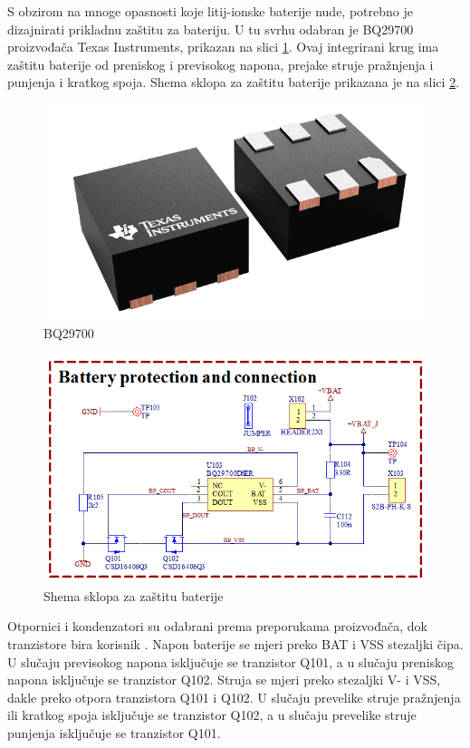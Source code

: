 S obzirom na mnoge opasnosti koje litij-ionske baterije nude, potrebno je dizajnirati prikladnu zaštitu za bateriju. U tu svrhu odabran je BQ29700 proizvođača Texas Instruments, prikazan na slici \ref{slk:BQ29700}. Ovaj integrirani krug ima zaštitu baterije od preniskog i previsokog napona, prejake struje pražnjenja i punjenja i kratkog spoja. Shema sklopa za zaštitu baterije prikazana je na slici \ref{slk:MB_BATPROT}.
\begin{figure}[hbt]
    \centering
    \includegraphics[width=10 cm]{Figures/BQ29700.png}
    \caption{BQ29700}
    \label{slk:BQ29700}
\end{figure}
\begin{figure}[hbt]
    \centering
    \includegraphics[width=10 cm]{Figures/MB_BATPROT.png}
    \caption{Shema sklopa za zaštitu baterije}
    \label{slk:MB_BATPROT}
\end{figure}
Otpornici i kondenzatori su odabrani prema preporukama proizvođača, dok tranzistore bira korisnik \cite{ti:bq29700}. Napon baterije se mjeri preko BAT i VSS stezaljki čipa. U slučaju previsokog napona isključuje se tranzistor Q101, a u slučaju preniskog napona isključuje se tranzistor Q102. Struja se mjeri preko stezaljki V- i VSS, dakle preko otpora tranzistora Q101 i Q102. U slučaju prevelike struje pražnjenja ili kratkog spoja isključuje se tranzistor Q102, a u slučaju prevelike struje punjenja isključuje se tranzistor Q101.


